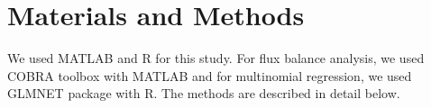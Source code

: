\documentclass[12pt]{article}
\begin{document}

\section*{Materials and Methods}
We used MATLAB and R for this study. For flux balance analysis, we used COBRA toolbox \cite{Schellenbergeretal2011} with MATLAB and for multinomial regression, we used GLMNET package \cite{Friedmanetal2010} with R. The methods are described in detail below.
\end{document}
